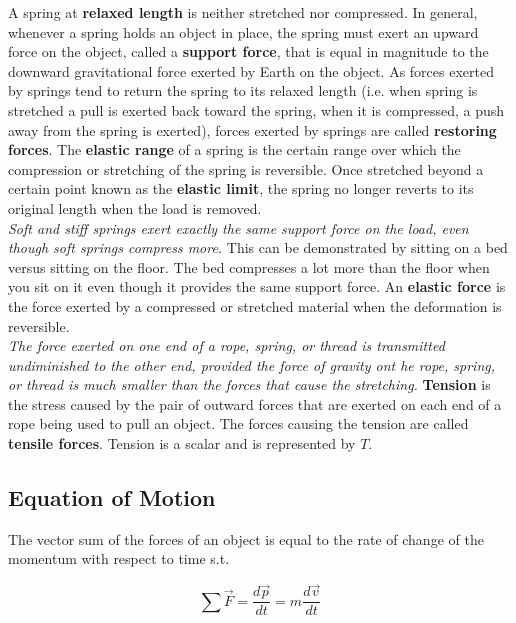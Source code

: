         A spring at \textbf{relaxed length} is neither stretched nor compressed. In general, whenever a spring holds an object in place, the spring must exert an upward force on the object, called a \textbf{support force},
        that is equal in magnitude to the downward gravitational force exerted by Earth on the object. As forces exerted by springs tend to return the spring to its relaxed length (i.e. when spring is stretched
        a pull is exerted back toward the spring, when it is compressed, a push away from the spring is exerted), forces exerted by springs are called \textbf{restoring forces}. The \textbf{elastic range} of a spring is
        the certain range over which the compression or stretching of the spring is reversible. Once stretched beyond a certain point known as the \textbf{elastic limit}, the spring no longer reverts to its original
        length when the load is removed. \\

        \textit{Soft and stiff springs exert exactly the same support force on the load, even though soft springs compress more.} This can be demonstrated by sitting on a bed versus sitting on the floor. The bed
        compresses a lot more than the floor when you sit on it even though it provides the same support force. An \textbf{elastic force} is the force exerted by a compressed or stretched material when the deformation
        is reversible. \\

        \textit{The force exerted on one end of a rope, spring, or thread is transmitted undiminished to the other end, provided the force of gravity ont he rope, spring, or thread is much smaller than the forces that
        cause the stretching.} \textbf{Tension} is the stress caused by the pair of outward forces that are exerted on each end of a rope being used to pull an object. The forces causing the tension are called
        \textbf{tensile forces}. Tension is a scalar and is represented by $T$.

    \subsection{Equation of Motion}

        The vector sum of the forces of an object is equal to the rate of change of the momentum with respect to time s.t.

        \[
            \sum \vec{F} = \frac{d\vec{p}}{dt} = m\frac{d\vec{v}}{dt}
        \]

